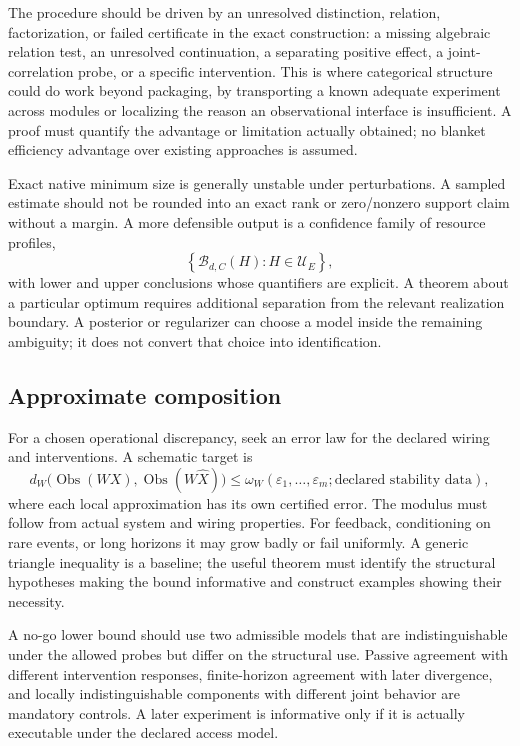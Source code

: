 \documentclass[11pt]{article}
\theoremstyle{remark}
\newcommand{\Obs}{\operatorname{Obs}}
\newcommand{\calU}{\mathcal U}
\begin{document}
The procedure should be driven by an unresolved distinction, relation, factorization, or failed certificate in the exact construction: a missing algebraic relation test, an unresolved continuation, a separating positive effect, a joint-correlation probe, or a specific intervention. This is where categorical structure could do work beyond packaging, by transporting a known adequate experiment across modules or localizing the reason an observational interface is insufficient. A proof must quantify the advantage or limitation actually obtained; no blanket efficiency advantage over existing approaches is assumed.

Exact native minimum size is generally unstable under perturbations. A sampled estimate should not be rounded into an exact rank or zero/nonzero support claim without a margin. A more defensible output is a confidence family of resource profiles,
\[
 \left\{\mathscr B_{d,C}(H):H\in\calU_E\right\},
\]
with lower and upper conclusions whose quantifiers are explicit. A theorem about a particular optimum requires additional separation from the relevant realization boundary. A posterior or regularizer can choose a model inside the remaining ambiguity; it does not convert that choice into identification.

\subsection{Approximate composition}

For a chosen operational discrepancy, seek an error law for the declared wiring and interventions. A schematic target is
\[
 d_W\bigl(\Obs(WX),\Obs(W\widehat X)\bigr)
 \leq \omega_W(\varepsilon_1,\ldots,\varepsilon_m;\text{declared stability data}),
\]
where each local approximation has its own certified error. The modulus must follow from actual system and wiring properties. For feedback, conditioning on rare events, or long horizons it may grow badly or fail uniformly. A generic triangle inequality is a baseline; the useful theorem must identify the structural hypotheses making the bound informative and construct examples showing their necessity.

A no-go lower bound should use two admissible models that are indistinguishable under the allowed probes but differ on the structural use. Passive agreement with different intervention responses, finite-horizon agreement with later divergence, and locally indistinguishable components with different joint behavior are mandatory controls. A later experiment is informative only if it is actually executable under the declared access model.
\end{document}
